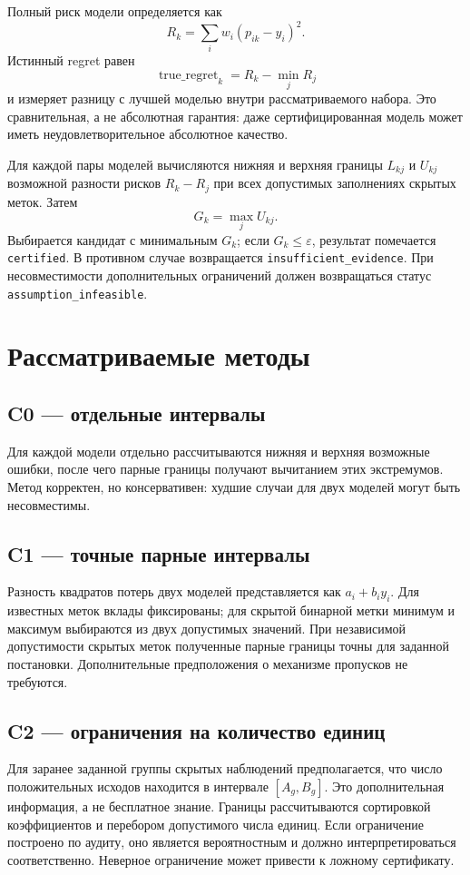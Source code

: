 \documentclass[12pt,a4paper]{article}
\begin{document}
Полный риск модели определяется как
\[
R_k=\sum_i w_i(p_{ik}-y_i)^2.
\]
Истинный regret равен
\[
\operatorname{true\_regret}_k=R_k-\min_j R_j
\]
и измеряет разницу с лучшей моделью внутри рассматриваемого набора. Это сравнительная, а не абсолютная гарантия: даже сертифицированная модель может иметь неудовлетворительное абсолютное качество.

Для каждой пары моделей вычисляются нижняя и верхняя границы $L_{kj}$ и $U_{kj}$ возможной разности рисков $R_k-R_j$ при всех допустимых заполнениях скрытых меток. Затем
\[
G_k=\max_j U_{kj}.
\]
Выбирается кандидат с минимальным $G_k$; если $G_k\leq\varepsilon$, результат помечается \texttt{certified}. В противном случае возвращается \texttt{insufficient\_evidence}. При несовместимости дополнительных ограничений должен возвращаться статус \texttt{assumption\_infeasible}.

\section{Рассматриваемые методы}
\subsection{C0 --- отдельные интервалы}
Для каждой модели отдельно рассчитываются нижняя и верхняя возможные ошибки, после чего парные границы получают вычитанием этих экстремумов. Метод корректен, но консервативен: худшие случаи для двух моделей могут быть несовместимы.

\subsection{C1 --- точные парные интервалы}
Разность квадратов потерь двух моделей представляется как $a_i+b_i y_i$. Для известных меток вклады фиксированы; для скрытой бинарной метки минимум и максимум выбираются из двух допустимых значений. При независимой допустимости скрытых меток полученные парные границы точны для заданной постановки. Дополнительные предположения о механизме пропусков не требуются.

\subsection{C2 --- ограничения на количество единиц}
Для заранее заданной группы скрытых наблюдений предполагается, что число положительных исходов находится в интервале $[A_g,B_g]$. Это дополнительная информация, а не бесплатное знание. Границы рассчитываются сортировкой коэффициентов и перебором допустимого числа единиц. Если ограничение построено по аудиту, оно является вероятностным и должно интерпретироваться соответственно. Неверное ограничение может привести к ложному сертификату.
\end{document}
